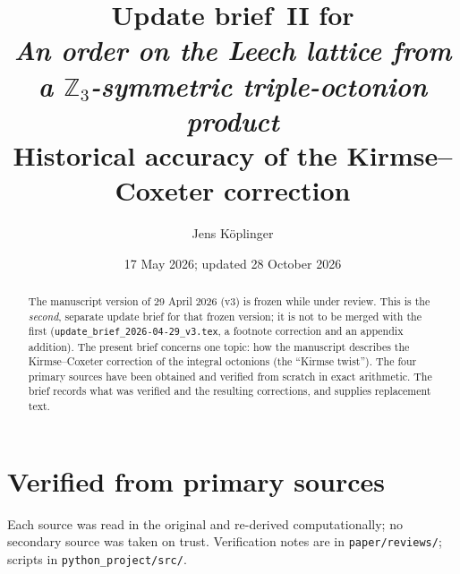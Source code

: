\documentclass[11pt]{amsart}
\title[Update brief II: the Kirmse twist]{Update brief~II for\\
\emph{An order on the Leech lattice from a $\mathbb{Z}_3$-symmetric
triple-octonion product}\\
\large Historical accuracy of the Kirmse--Coxeter correction}
\author{Jens K\"oplinger}
\date{17 May 2026; updated 28 October 2026}
\begin{document}
\maketitle

\begin{abstract}
The manuscript version of 29 April 2026 (v3) is frozen while under review.
This is the \emph{second}, separate update brief for that frozen version; it
is not to be merged with the first
(\texttt{update\_brief\_2026-04-29\_v3.tex}, a footnote correction and an
appendix addition).  The present brief concerns one topic: how the
manuscript describes the Kirmse--Coxeter correction of the integral
octonions (the ``Kirmse twist'').  The four primary sources have been
obtained and verified from scratch in exact arithmetic.  The brief records what was verified and the resulting
corrections, and supplies replacement text.
\end{abstract}

\section{Verified from primary sources}\label{sec:verified}

Each source was read in the original and re-derived computationally;
no secondary source was taken on trust.  Verification notes are in
\texttt{paper/reviews/}; scripts in \texttt{python\_project/src/}.
\end{document}
